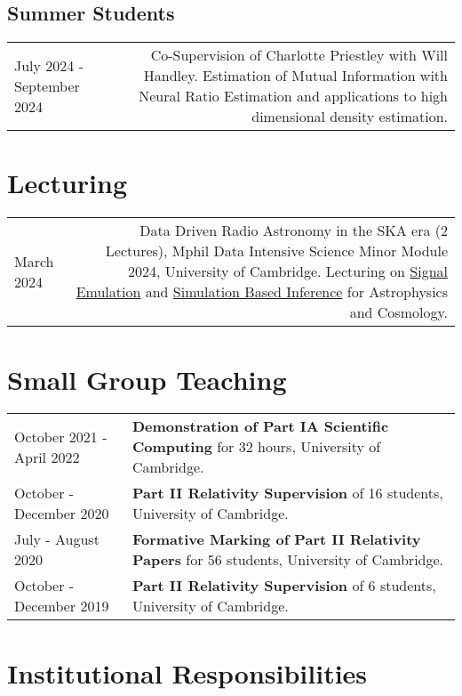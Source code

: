 \documentclass{article}
\begin{document}
\subsection*{Summer Students}

\begin{tabular}{L!{\vrule}R}
    July 2024 - September 2024 & Co-Supervision of Charlotte Priestley  with Will Handley. Estimation of Mutual Information with Neural Ratio Estimation and applications to high dimensional density estimation. \\
\end{tabular}

\section*{Lecturing}

\begin{tabular}{L!{\vrule}R}
    March 2024 & Data Driven Radio Astronomy in the SKA era (2 Lectures), Mphil Data Intensive Science Minor Module 2024, University of Cambridge. Lecturing on \href{https://github.com/htjb/Talks/raw/master/Lectures/MPhil_Data_Intensive_Science_Lectures_2024/Lecture-15.pdf}{Signal Emulation} and \href{https://github.com/htjb/Talks/raw/master/Lectures/MPhil_Data_Intensive_Science_Lectures_2024/Lecture-16.pdf}{Simulation Based Inference} for Astrophysics and Cosmology.
\end{tabular}

\section*{Small Group Teaching}

\begin{tabular}{>{\raggedleft}p{}!{\vrule}p{0.76\textwidth}}
	October 2021 - April 2022 & \textbf{Demonstration of Part IA Scientific Computing} for 32 hours, University of Cambridge.\\
	October - December 2020 & \textbf{Part II Relativity Supervision} of 16 students,  University of Cambridge. \\
	July - August 2020 & \textbf{Formative Marking of Part II Relativity Papers} for 56 students, University of Cambridge. \\
	October - December 2019 & \textbf{Part II Relativity Supervision} of 6 students, University of Cambridge.
\end{tabular}

\section*{Institutional Responsibilities}
\end{document}
